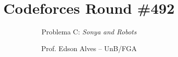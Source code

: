 \title{Codeforces Round \#492}
\subtitle{Problema C: \textit{Sonya and Robots}}
\author{Prof. Edson Alves -- UnB/FGA}
\date{}
